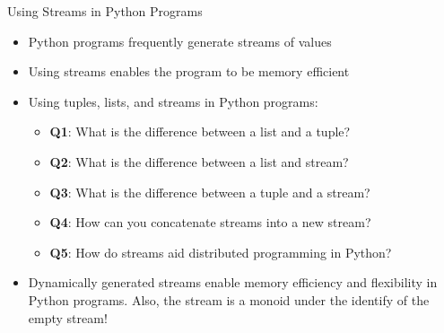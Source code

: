 \documentclass[14pt,aspectratio=169]{beamer}
\begin{document}
%
\begin{frame}{Using Streams in Python Programs}
  \begin{itemize}
    \item Python programs frequently generate streams of values
      \vspace*{-.2in}
    \item Using streams enables the program to be memory efficient
      \vspace*{-.2in}
    \item Using tuples, lists, and streams in Python programs:
      \begin{itemize}
        \item {\bf Q1}: What is the difference between a list and a tuple?
        \item {\bf Q2}: What is the difference between a list and stream?
        \item {\bf Q3}: What is the difference between a tuple and a stream?
        \item {\bf Q4}: How can you concatenate streams into a new stream?
        \item {\bf Q5}: How do streams aid distributed programming in Python?
      \end{itemize}
      \vspace*{-.2in}
    \item Dynamically generated streams enable memory efficiency and
      flexibility in Python programs. Also, the stream is a monoid under the
      identify of the empty stream!
  \end{itemize}
\end{frame}
\end{document}
